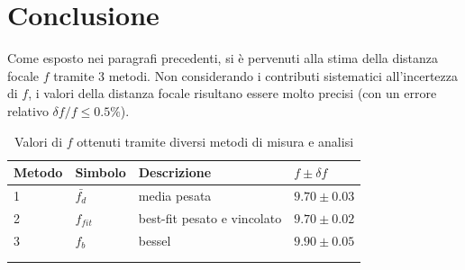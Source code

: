 \documentclass[11pt,a4paper]{article}
\begin{document}
\section{Conclusione}
Come esposto nei paragrafi precedenti, si è pervenuti alla stima della distanza focale $f$ tramite 3 metodi. Non considerando i contributi sistematici all'incertezza di $f$, i valori della distanza focale risultano essere molto precisi (con un errore relativo $\delta f/f \leq 0.5\%$).

 \begin{longtable}{@{}llll@{}}
\toprule
Metodo & Simbolo & Descrizione & $f \pm \delta f$ \tabularnewline
\midrule
1 & $\bar{f_d}$ & media pesata & $9.70 \pm 0.03$ \tabularnewline
2 & $f_{fit}$ & best-fit pesato e vincolato & $9.70 \pm 0.02$ \tabularnewline
3 & $f_b$ & bessel & $9.90 \pm 0.05$ \tabularnewline
    \bottomrule
    \label{tab:fs-no-sist}
    \\
    \caption{Valori di $f$ ottenuti tramite diversi metodi di misura e analisi}
 \end{longtable}
\end{document}
